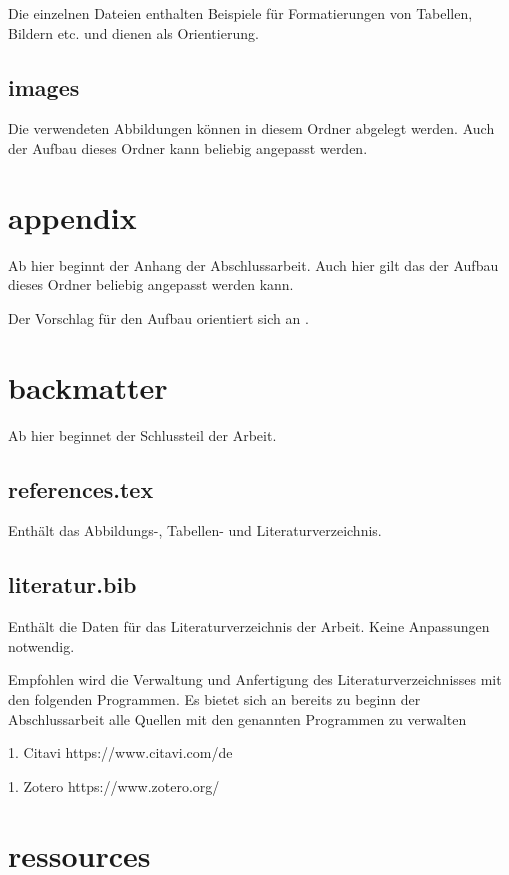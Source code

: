 Die einzelnen Dateien enthalten Beispiele für Formatierungen von Tabellen, Bildern etc. und dienen als Orientierung.

\subsection*{images}

Die verwendeten Abbildungen können in diesem Ordner abgelegt werden. Auch der Aufbau dieses Ordner kann beliebig angepasst werden.

\section*{appendix}

Ab hier beginnt der Anhang der Abschlussarbeit. Auch hier gilt das der Aufbau dieses Ordner beliebig angepasst werden kann.

Der Vorschlag für den Aufbau orientiert sich an .

\section*{backmatter}

Ab hier beginnet der Schlussteil der Arbeit.

\subsection*{references.tex}

Enthält das Abbildungs-, Tabellen- und Literaturverzeichnis. 

\subsection*{literatur.bib}

Enthält die Daten für das Literaturverzeichnis der Arbeit. Keine Anpassungen notwendig.

Empfohlen wird die Verwaltung und Anfertigung des Literaturverzeichnisses mit den folgenden Programmen. Es bietet sich an bereits zu beginn der Abschlussarbeit alle Quellen mit den genannten Programmen zu verwalten

1. Citavi https://www.citavi.com/de

1. Zotero https://www.zotero.org/

\section*{ressources}

